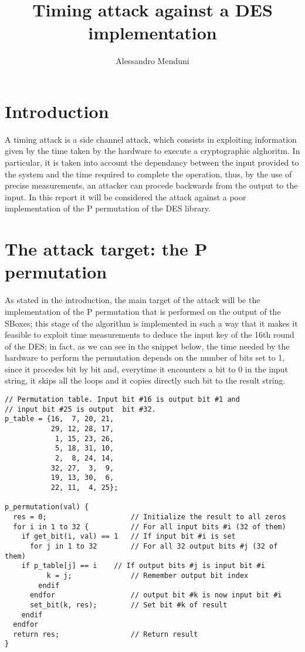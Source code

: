 \documentclass[11pt]{article} %
\title{Timing attack against a DES implementation}
\author{Alessandro Menduni}
\begin{document}
\maketitle

\section{Introduction}
A timing attack is a side channel attack, which consists in exploiting information given by the time taken by the hardware to execute a cryptographic alghoritm. In particular, it is taken into account the dependancy between the input provided to the system and the time required to complete the operation, thus, by the use of precise measurements, an attacker can procede backwards from the output to the input. In this report it will be considered the attack against a poor implementation of the P permutation of the DES library.

\section{The attack target: the P permutation }
As stated in the introduction, the main target of the attack will be the implementation of the P permutation that is performed on the output of the SBoxes; this stage of the algorithm is implemented in such a way that it makes it feasible to exploit time measurements to deduce the input key of the 16th round of the DES; in fact, as we can see in the snippet below, the time needed by the hardware to perform the permutation depends on the number of bits set to 1, since it procedes bit by bit and, everytime it encounters a bit to 0 in the input string, it skips all the loops and it copies directly such bit to the result string.

\vspace{1 mm}
\begin{lstlisting}
// Permutation table. Input bit #16 is output bit #1 and
// input bit #25 is output  bit #32.
p_table = {16,  7, 20, 21,
           29, 12, 28, 17,
            1, 15, 23, 26,
            5, 18, 31, 10,
            2,  8, 24, 14,
           32, 27,  3,  9,
           19, 13, 30,  6,
           22, 11,  4, 25};

p_permutation(val) {
  res = 0;                    // Initialize the result to all zeros
  for i in 1 to 32 {          // For all input bits #i (32 of them)
    if get_bit(i, val) == 1   // If input bit #i is set
      for j in 1 to 32        // For all 32 output bits #j (32 of them)
	if p_table[j] == i    // If output bits #j is input bit #i
          k = j;              // Remember output bit index
        endif
      endfor                  // output bit #k is now input bit #i
      set_bit(k, res);        // Set bit #k of result
    endif
  endfor
  return res;                 // Return result
}
\end{lstlisting}
\end{document}
